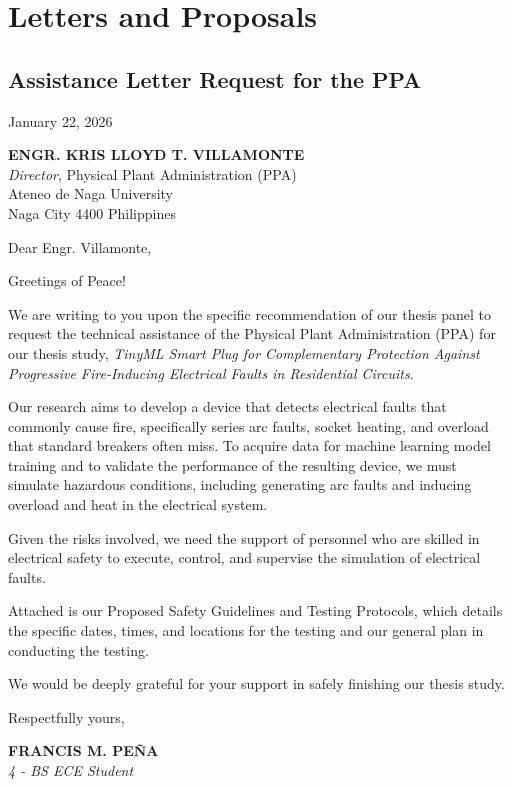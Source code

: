 \chapter{Letters and Proposals}\label{app:g}

\section{Assistance Letter Request for the PPA}
\label{appendix-g-assistance-letter}

\noindent January 22, 2026

\noindent\textbf{ENGR. KRIS LLOYD T. VILLAMONTE}\\
\emph{Director}, Physical Plant Administration (PPA)\\
Ateneo de Naga University\\
Naga City 4400 Philippines

\noindent Dear Engr. Villamonte,

Greetings of Peace!

We are writing to you upon the specific recommendation of our thesis panel to
request the technical assistance of the Physical Plant Administration (PPA) for
our thesis study, \emph{TinyML Smart Plug for Complementary Protection Against
Progressive Fire-Inducing Electrical Faults in Residential Circuits}.

Our research aims to develop a device that detects electrical faults that
commonly cause fire, specifically series arc faults, socket heating, and
overload that standard breakers often miss. To acquire data for machine
learning model training and to validate the performance of the resulting
device, we must simulate hazardous conditions, including generating arc faults
and inducing overload and heat in the electrical system.

Given the risks involved, we need the support of personnel who are skilled in
electrical safety to execute, control, and supervise the simulation of
electrical faults.

Attached is our Proposed Safety Guidelines and Testing Protocols, which
details the specific dates, times, and locations for the testing and our
general plan in conducting the testing.

We would be deeply grateful for your support in safely finishing our thesis
study.

\noindent Respectfully yours,

\vspace{4\baselineskip}
\noindent\textbf{FRANCIS M. PE\~{N}A}\\
\emph{4 - BS ECE Student}

